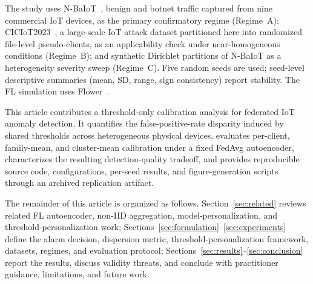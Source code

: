 The study uses N-BaIoT~\cite{meidan2018n}, benign and botnet traffic captured from
nine commercial IoT devices, as the primary confirmatory regime (Regime~A);
CICIoT2023~\cite{neto2023ciciot2023}, a large-scale IoT attack dataset partitioned here
into randomized file-level pseudo-clients, as an applicability check under
near-homogeneous conditions (Regime~B); and synthetic Dirichlet partitions of N-BaIoT as a
heterogeneity severity sweep (Regime~C).
Five random seeds are used; seed-level descriptive summaries (mean, SD, range, sign consistency) report stability.
The FL simulation uses Flower~\cite{beutel2020flower}.

This article contributes a threshold-only calibration analysis for federated IoT
anomaly detection. It quantifies the false-positive-rate disparity induced by shared
thresholds across heterogeneous physical devices, evaluates per-client, family-mean,
and cluster-mean calibration under a fixed FedAvg autoencoder, characterizes the
resulting detection-quality tradeoff, and provides reproducible source code,
configurations, per-seed results, and figure-generation scripts through an
archived replication artifact.

The remainder of this article is organized as follows. Section~\ref{sec:related}
reviews related FL autoencoder, non-IID aggregation, model-personalization, and
threshold-personalization work; Sections~\ref{sec:formulation}--\ref{sec:experiments}
define the alarm decision, dispersion metric, threshold-personalization framework,
datasets, regimes, and evaluation protocol;
Sections~\ref{sec:results}--\ref{sec:conclusion} report the results, discuss validity
threats, and conclude with practitioner guidance, limitations, and future work.
